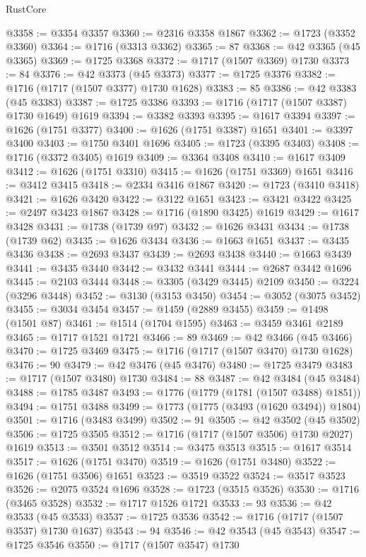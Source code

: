 \begin{lexlean}{RustCore}
\begin{coremodule}
@3358 := @3354 @3357
@3360 := @2316 @3358 @1867
@3362 := @1723 (@3352 @3360)
@3364 := @1716 (@3313 @3362)
@3365 := 87
@3368 := @42 @3365 (@45 @3365)
@3369 := @1725 @3368
@3372 := @1717 (@1507 @3369) @1730
@3373 := 84
@3376 := @42 @3373 (@45 @3373)
@3377 := @1725 @3376
@3382 := @1716 (@1717 (@1507 @3377) @1730 @1628)
@3383 := 85
@3386 := @42 @3383 (@45 @3383)
@3387 := @1725 @3386
@3393 := @1716 (@1717 (@1507 @3387) @1730 @1649) @1619
@3394 := @3382 @3393
@3395 := @1617 @3394
@3397 := @1626 (@1751 @3377)
@3400 := @1626 (@1751 @3387) @1651
@3401 := @3397 @3400
@3403 := @1750 @3401 @1696
@3405 := @1723 (@3395 @3403)
@3408 := @1716 (@3372 @3405) @1619
@3409 := @3364 @3408
@3410 := @1617 @3409
@3412 := @1626 (@1751 @3310)
@3415 := @1626 (@1751 @3369) @1651
@3416 := @3412 @3415
@3418 := @2334 @3416 @1867
@3420 := @1723 (@3410 @3418)
@3421 := @1626 @3420
@3422 := @3122 @1651
@3423 := @3421 @3422
@3425 := @2497 @3423 @1867
@3428 := @1716 (@1890 @3425) @1619
@3429 := @1617 @3428
@3431 := @1738 (@1739 @97)
@3432 := @1626 @3431
@3434 := @1738 (@1739 @62)
@3435 := @1626 @3434
@3436 := @1663 @1651
@3437 := @3435 @3436
@3438 := @2693 @3437
@3439 := @2693 @3438
@3440 := @1663 @3439
@3441 := @3435 @3440
@3442 := @3432 @3441
@3444 := @2687 @3442 @1696
@3445 := @2103 @3444
@3448 := @3305 (@3429 @3445) @2109
@3450 := @3224 (@3296 @3448)
@3452 := @3130 (@3153 @3450)
@3454 := @3052 (@3075 @3452)
@3455 := @3034 @3454
@3457 := @1459 (@2889 @3455)
@3459 := @1498 (@1501 @87)
@3461 := @1514 (@1704 @1595)
@3463 := @3459 @3461 @2189
@3465 := @1717 @1521 @1721
@3466 := 89
@3469 := @42 @3466 (@45 @3466)
@3470 := @1725 @3469
@3475 := @1716 (@1717 (@1507 @3470) @1730 @1628)
@3476 := 90
@3479 := @42 @3476 (@45 @3476)
@3480 := @1725 @3479
@3483 := @1717 (@1507 @3480) @1730
@3484 := 88
@3487 := @42 @3484 (@45 @3484)
@3488 := @1785 @3487
@3493 := @1776 (@1779 (@1781 (@1507 @3488) @1851))
@3494 := @1751 @3488
@3499 := @1773 (@1775 (@3493 (@1620 @3494)) @1804)
@3501 := @1716 (@3483 @3499)
@3502 := 91
@3505 := @42 @3502 (@45 @3502)
@3506 := @1725 @3505
@3512 := @1716 (@1717 (@1507 @3506) @1730 @2027) @1619
@3513 := @3501 @3512
@3514 := @3475 @3513
@3515 := @1617 @3514
@3517 := @1626 (@1751 @3470)
@3519 := @1626 (@1751 @3480)
@3522 := @1626 (@1751 @3506) @1651
@3523 := @3519 @3522
@3524 := @3517 @3523
@3526 := @2075 @3524 @1696
@3528 := @1723 (@3515 @3526)
@3530 := @1716 (@3465 @3528)
@3532 := @1717 @1526 @1721
@3533 := 93
@3536 := @42 @3533 (@45 @3533)
@3537 := @1725 @3536
@3542 := @1716 (@1717 (@1507 @3537) @1730 @1637)
@3543 := 94
@3546 := @42 @3543 (@45 @3543)
@3547 := @1725 @3546
@3550 := @1717 (@1507 @3547) @1730

\end{coremodule}
\end{lexlean}
